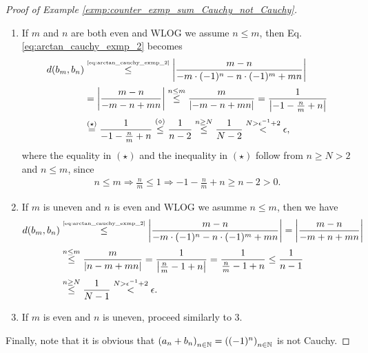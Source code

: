 \begin{proof}[Proof of Example \ref{exmp:counter_exmp_sum_Cauchy_not_Cauchy}]
\begin{enumerate}
		\item If $m$ and $n$ are both even and WLOG we assume $n\leq m$, then Eq. \eqref{eq:arctan_cauchy_exmp_2} becomes
		\begin{align*}
			d(b_m, b_n) &\overset{\tiny\eqref{eq:arctan_cauchy_exmp_2}}{\leq} \abs{\frac{m - n}{- m \cdot (-1)^n -n\cdot (-1)^m + mn}}
			\\[2pt] &= \abs{\frac{m - n}{-m-n+mn}} \overset{n\leq m}{\leq} \frac{m}{\abs{-m -n + mn}} = \frac{1}{\abs{-1 -\frac{n}{m} + n}}
			\\[2pt] &\overset{(\star)}{=} \frac{1}{-1-\frac{n}{m} + n} \overset{(\diamond)}{\leq}\frac{1}{n - 2} \overset{n\geq N}{\leq} \frac{1}{N - 2} \overset{N > \epsilon^{-1} + 2}{<} \epsilon,
		\end{align*} 
		where the equality in $(\star)$ and the inequality in $(\star)$ follow from $n\geq N > 2$ and $n\leq m$, since 
		\begin{align*}
			n \leq m \Rightarrow \frac{n}{m} \leq 1\Rightarrow -1- \frac{n}{m} + n\geq n - 2 > 0.
		\end{align*}
		
		\item If $m$ is uneven and $n$ is even and WLOG we asumme $n\leq m$, then we have
		\begin{align*}
			d(b_m, b_n) &\overset{\tiny\eqref{eq:arctan_cauchy_exmp_2}}{\leq} \abs{\frac{m - n}{- m \cdot (-1)^n -n\cdot (-1)^m + mn}} = \abs{\frac{m - n}{-m + n + mn}}
			\\[2pt] &\overset{n\leq m}{\leq} \frac{m}{\abs{n - m + mn}} = \frac{1}{\abs{\frac{n}{m} - 1 + n}} = \frac{1}{\frac{n}{m} - 1 + n} \leq \frac{1}{n - 1}
			\\[2pt] &\overset{n \geq N}{\leq} \frac{1}{N - 1} \overset{N > \epsilon^{-1} + 2}{<} \epsilon.
		\end{align*}
		
		\item If $m$ is even and $n$ is uneven, proceed similarly to 3.
	\end{enumerate}
	Finally, note that it is obvious that $\seq[a_n + b_n] = \seq[(-1)^n]$ is not Cauchy.
\end{proof}

